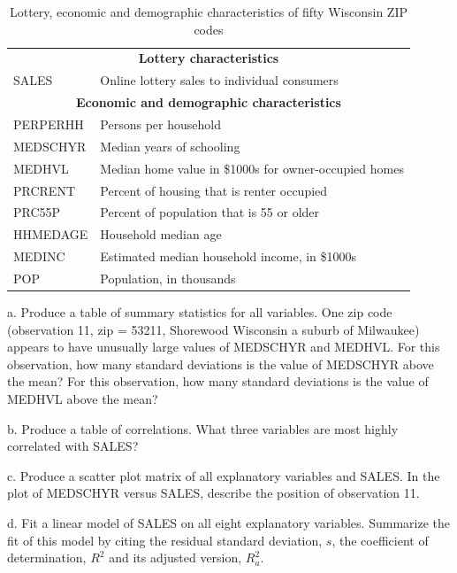 \begin{exercises}
\begin{table}[h]
 \caption{\label{Ex:LotVariables} \small Lottery,
economic and demographic characteristics of fifty Wisconsin ZIP
codes}
\begin{center}
\begin{tabular}{ll}
\hline
\multicolumn{ 2}{c}{{\bf Lottery characteristics}} \\
  SALES  & Online lottery sales to individual consumers \\
\hline
\multicolumn{ 2}{c}{{\bf Economic and demographic characteristics}} \\
 PERPERHH  & Persons per household  \\
 MEDSCHYR  & Median years of schooling  \\
   MEDHVL  & Median home value in \$1000s for owner-occupied homes \\
 PRCRENT   & Percent of housing that is renter occupied \\
 PRC55P    & Percent of population that is 55 or older \\
 HHMEDAGE  & Household median age \\
MEDINC      & Estimated median household income, in \$1000s \\
POP   & Population, in thousands \\
\hline

\end{tabular}
\end{center}
\end{table}

a. Produce a table of summary statistics for all variables. One zip
code (observation 11, zip = 53211, Shorewood Wisconsin a suburb of
Milwaukee) appears to have unusually large values of MEDSCHYR and
MEDHVL. For this observation, how many standard deviations is the
value of MEDSCHYR above the mean? For this observation, how many
standard deviations is the value of MEDHVL above the mean?

b. Produce a table of correlations. What three variables are most
highly correlated with SALES?

c. Produce a scatter plot matrix of all explanatory variables and
SALES. In the plot of MEDSCHYR versus SALES, describe the position
of observation 11.

d. Fit a linear model of SALES on all eight explanatory variables.
Summarize the fit of this model by citing the residual standard
deviation, $s$, the coefficient of determination, $R^2$ and its
adjusted version, $R^2_a$.


\end{exercises}
